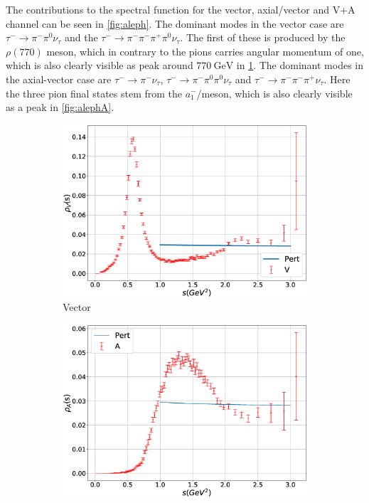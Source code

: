 \documentclass[../../index.tex]{subfiles}
\begin{document}
The contributions to the spectral function for the vector, axial\-/vector and
V+A channel can be seen in \cref{fig:aleph}. The dominant modes in the vector
case are \cite{Davier2006} \(\tau^- \to \pi^-\pi^0 \nu_\tau\) and the \(\tau^-
\to \pi^- \pi^- \pi^+ \pi^0 \nu_\tau\). The first of these is produced by the
\(\rho(770)\) meson, which in contrary to the pions carries angular momentum of
one, which is also clearly visible as peak around \(\SI{770}{\giga\eV}\) in
\cref{fig:alephV}. The dominant modes in the axial-vector case are \(\tau^-\to
\pi^-\nu_\tau\), \(\tau^-\to \pi^- \pi^0 \pi^0 \nu_\tau\) and \(\tau^- \to \pi^-
\pi^- \pi^+\nu_\tau\). Here the three pion final states stem from the
\(a_1^-\)\-/meson, which is also clearly visible as a peak in \cref{fig:alephA}.
\begin{figure}
  \centering
  \begin{subfigure}[b]{0.49\textwidth}
    \includegraphics[width=\textwidth]{./images/specFuncAleph_V.eps}
    \caption{Vector}
    \label{fig:alephV}
  \end{subfigure}
  \begin{subfigure}[b]{0.49\textwidth}
    \includegraphics[width=\textwidth]{./images/specFuncAleph_A.eps}

\end{subfigure}
\end{figure}
\end{document}
